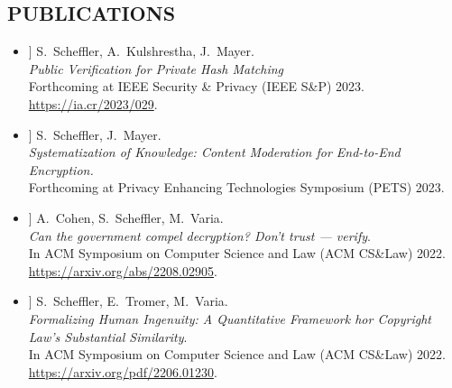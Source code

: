 \documentclass{res}
\begin{document}
\begin{resume}
\section{PUBLICATIONS}
\vspace{0.25in}

\newcommand{\csamimprovements}{[1]\xspace}
\newcommand{\eeesok}{[2]\xspace}
\newcommand{\foregoneVerif}{[3]\xspace}
\newcommand{\copyrightMDL}{[4]\xspace}
\newcommand{\turboikos}{[5]\xspace}
\newcommand{\booligero}{[6]\xspace}
\newcommand{\foregoneconclusion}{[7]\xspace}
\newcommand{\privateTranslation}{[8]\xspace}
\newcommand{\AEC}{[9]\xspace}
\newcommand{\pullingblocksJIP}{[10]\xspace}
\newcommand{\devicefingerprinting}{[11]\xspace}
\newcommand{\pullingblocks}{[12]\xspace}
\newcommand{\fairsibility}{[13]\xspace}
\newcommand{\emailspam}{[14]\xspace}

\begin{itemize}
\item[\csamimprovements] S.~Scheffler, A.~Kulshrestha, J.~Mayer. \\
\emph{Public Verification for Private Hash Matching} \\
Forthcoming at IEEE Security \& Privacy (IEEE S\&P) 2023. \\
\url{https://ia.cr/2023/029}.

\item[\eeesok] S.~Scheffler, J.~Mayer. \\
\emph{Systematization of Knowledge: Content Moderation for End-to-End Encryption.} \\
Forthcoming at Privacy Enhancing Technologies Symposium (PETS) 2023.

\item[\foregoneVerif] A.~Cohen, S.~Scheffler, M.~Varia. \\
\emph{Can the government compel decryption?  Don't trust --- verify}. \\
In ACM Symposium on Computer Science and Law (ACM CS\&Law) 2022. \\
\url{https://arxiv.org/abs/2208.02905}.

\item[\copyrightMDL] S.~Scheffler, E.~Tromer, M.~Varia. \\
\emph{Formalizing Human Ingenuity: A Quantitative Framework hor Copyright Law's Substantial Similarity}. \\
In ACM Symposium on Computer Science and Law (ACM CS\&Law) 2022. \\
\url{https://arxiv.org/pdf/2206.01230}.


\end{itemize}
\end{resume}
\end{document}
